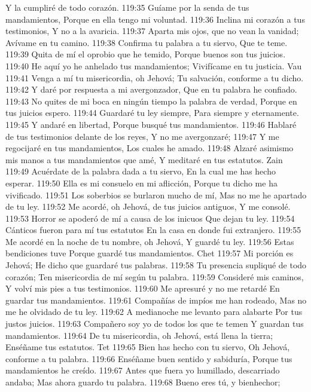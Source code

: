Y la cumpliré de todo corazón. 
119:35 Guíame por la senda de tus mandamientos, 
Porque en ella tengo mi voluntad. 
119:36 Inclina mi corazón a tus testimonios, 
Y no a la avaricia. 
119:37 Aparta mis ojos, que no vean la vanidad; 
Avívame en tu camino. 
119:38 Confirma tu palabra a tu siervo, 
Que te teme. 
119:39 Quita de mí el oprobio que he temido, 
Porque buenos son tus juicios. 
119:40 He aquí yo he anhelado tus mandamientos; 
Vivifícame en tu justicia. 
Vau 
119:41 Venga a mí tu misericordia, oh Jehová; 
Tu salvación, conforme a tu dicho. 
119:42 Y daré por respuesta a mi avergonzador, 
Que en tu palabra he confiado. 
119:43 No quites de mi boca en ningún tiempo la palabra de verdad, 
Porque en tus juicios espero. 
119:44 Guardaré tu ley siempre, 
Para siempre y eternamente. 
119:45 Y andaré en libertad, 
Porque busqué tus mandamientos. 
119:46 Hablaré de tus testimonios delante de los reyes, 
Y no me avergonzaré; 
119:47 Y me regocijaré en tus mandamientos, 
Los cuales he amado. 
119:48 Alzaré asimismo mis manos a tus mandamientos que amé, 
Y meditaré en tus estatutos. 
Zain 
119:49 Acuérdate de la palabra dada a tu siervo, 
En la cual me has hecho esperar. 
119:50 Ella es mi consuelo en mi aflicción, 
Porque tu dicho me ha vivificado. 
119:51 Los soberbios se burlaron mucho de mí, 
Mas no me he apartado de tu ley. 
119:52 Me acordé, oh Jehová, de tus juicios antiguos, 
Y me consolé. 
119:53 Horror se apoderó de mí a causa de los inicuos 
Que dejan tu ley. 
119:54 Cánticos fueron para mí tus estatutos 
En la casa en donde fui extranjero. 
119:55 Me acordé en la noche de tu nombre, oh Jehová, 
Y guardé tu ley. 
119:56 Estas bendiciones tuve 
Porque guardé tus mandamientos. 
Chet 
119:57 Mi porción es Jehová; 
He dicho que guardaré tus palabras. 
119:58 Tu presencia supliqué de todo corazón; 
Ten misericordia de mí según tu palabra. 
119:59 Consideré mis caminos, 
Y volví mis pies a tus testimonios. 
119:60 Me apresuré y no me retardé 
En guardar tus mandamientos. 
119:61 Compañías de impíos me han rodeado, 
Mas no me he olvidado de tu ley. 
119:62 A medianoche me levanto para alabarte 
Por tus justos juicios. 
119:63 Compañero soy yo de todos los que te temen 
Y guardan tus mandamientos. 
119:64 De tu misericordia, oh Jehová, está llena la tierra; 
Enséñame tus estatutos. 
Tet 
119:65 Bien has hecho con tu siervo, 
Oh Jehová, conforme a tu palabra. 
119:66 Enséñame buen sentido y sabiduría, 
Porque tus mandamientos he creído. 
119:67 Antes que fuera yo humillado, descarriado andaba; 
Mas ahora guardo tu palabra. 
119:68 Bueno eres tú, y bienhechor; 
